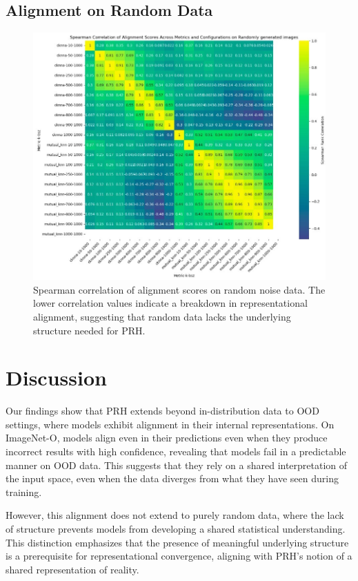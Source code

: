 \documentclass[10pt,a4paper]{article}
\begin{document}
\subsection{Alignment on Random Data}
\begin{figure}[H]
    \centering
    \includegraphics[width=\textwidth]{prh_correlation_random.jpg}
    \caption{Spearman correlation of alignment scores on random noise data. The lower correlation values indicate a breakdown in representational alignment, suggesting that random data lacks the underlying structure needed for PRH.}
    \label{fig:prh_correlation_random}
\end{figure}

\section{Discussion}
Our findings show that PRH extends beyond in-distribution data to OOD settings, where models exhibit alignment in their internal representations. On ImageNet-O, models align even in their predictions even when they produce incorrect results with high confidence, revealing that models fail in a predictable manner on OOD data. This suggests that they rely on a shared interpretation of the input space, even when the data diverges from what they have seen during training.

However, this alignment does not extend to purely random data, where the lack of structure prevents models from developing a shared statistical understanding. This distinction emphasizes that the presence of meaningful underlying structure is a prerequisite for representational convergence, aligning with PRH's notion of a shared representation of reality.
\clearpage
\end{document}
